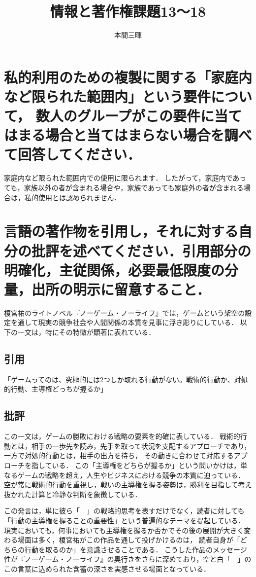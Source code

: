 \documentclass[titlepage,a4paper]{jsarticle}
\title{情報と著作権課題13〜18}
\author{本間三暉}
\begin{document}
\maketitle
\section{私的利用のための複製に関する「家庭内など限られた範囲内」という要件について，
  数人のグループがこの要件に当てはまる場合と当てはまらない場合を調べて回答してください．}%
家庭内など限られた範囲内での使用に限られます．
したがって，家庭内であっても，家族以外の者が含まれる場合や，家族であっても家庭外の者が含まれる場合は，私的使用とは認められません\cite{R6}．

\section{言語の著作物を引用し，それに対する自分の批評を述べてください．引用部分の明確化，主従関係，必要最低限度の分量，出所の明示に留意すること．}
榎宮祐のライトノベル『ノーゲーム・ノーライフ』では，ゲームという架空の設定を通して現実の競争社会や人間関係の本質を見事に浮き彫りにしている．
以下の一文は，特にその特徴が顕著に表れている．

\subsection{引用}
「ゲームってのは、究極的には2つしか取れる行動がない。戦術的行動か、対処的行動、主導権どっちが握るか」\cite{no_game_no_life}

\subsection{批評}
この一文は，ゲームの勝敗における戦略の要素を的確に表している．
戦術的行動とは，相手の一歩先を読み，先手を取って状況を支配するアプローチであり，一方で対処的行動とは，相手の出方を待ち，
その動きに合わせて対応するアプローチを指している．
この「主導権をどちらが握るか」という問いかけは，単なるゲームの戦略を超え，人生やビジネスにおける競争の本質に迫っている．
空が常に戦術的行動を重視し，戦いの主導権を握る姿勢は，勝利を目指して考え抜かれた計算と冷静な判断を象徴している．

この発言は，単に彼ら「　」の戦略的思考を表すだけでなく，読者に対しても「行動の主導権を握ることの重要性」という普遍的なテーマを提起している．
現実においても，何事においても主導権を握るか否かでその後の展開が大きく変わる場面は多く，榎宮祐がこの作品を通して投げかけるのは，
読者自身が「どちらの行動を取るのか」を意識させることである．
こうした作品のメッセージ性が『ノーゲーム・ノーライフ』の奥行きをさらに深めており，空と白「　」のこの言葉に込められた含蓄の深さを実感させる場面となっている．
\end{document}
